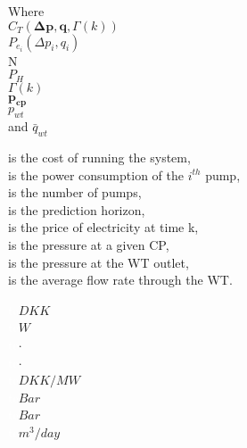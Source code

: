  \begin{minipage}[t]{0.24\textwidth}
 Where\\
 \hspace*{8mm} $C_T(\pmb{\Delta{p}},\pmb{q},\Gamma(k))$ \\
 \hspace*{8mm} $P_{e_{i}}(\Delta{p}_i,q_i)$ \\
 \hspace*{8mm} N \\
 \hspace*{8mm} $P_H$ \\
 \hspace*{8mm} $\Gamma(k)$ \\
 \hspace*{8mm} $\pmb{p_{cp}}$ \\
 \hspace*{8mm} $p_{wt}$ \\
  and \hspace*{0.7mm} $\bar{q}_{wt}$	
 \end{minipage}
 \begin{minipage}[t]{0.63\textwidth}
 \vspace*{2mm}
 is the cost of running the system, \\
 is the power consumption of the $i^{th}$ pump,\\
 is the number of pumps,\\
 is the prediction horizon,\\
 is the price of electricity at time k,\\ 
 is the pressure at a given CP,\\ %
 is the pressure at the WT outlet,\\ %
 is the average flow rate through the WT. %
 \end{minipage}
 \begin{minipage}[t]{0.10\textwidth}
 \vspace*{2mm}
 \textcolor{White}{te}$\unit{DKK}$\\
 \textcolor{White}{te}$\unit{W}$\\
 \textcolor{White}{te}$\unit{\cdot}$\\
 \textcolor{White}{te}$\unit{\cdot}$\\
 \textcolor{White}{te}$\unit{{DKK}/{MW}}$\\
 \textcolor{White}{te}$\unit{Bar}$\\
 \textcolor{White}{te}$\unit{Bar}$\\
  \textcolor{White}{te}$\unit{{m^3}/{day}}$
 \end{minipage}

